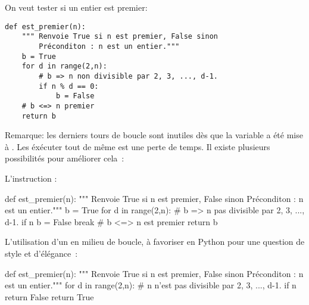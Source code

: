 

On veut tester si un entier  est premier:


\begin{lstlisting}
def est_premier(n):
    """ Renvoie True si n est premier, False sinon
        Préconditon : n est un entier."""
    b = True
    for d in range(2,n):
        # b => n non divisible par 2, 3, ..., d-1.
        if n % d == 0:
            b = False
    # b <=> n premier
    return b
\end{lstlisting}

Remarque: les derniers tours de boucle sont inutiles dès que la
variable  a été mise à . Les éxécuter tout de même est une perte de temps. Il 
existe plusieurs possibilités pour améliorer cela~:

L'instruction  :
\begin{pyverbatim}
def est_premier(n):
    """ Renvoie True si n est premier, False sinon
        Préconditon : n est un entier."""
    b = True
    for d in range(2,n):
        # b => n pas divisible par 2, 3, ..., d-1.
        if n %
            b = False
            break
    # b <=> n est premier
    return b
\end{pyverbatim}

L'utilisation d'un  en milieu de boucle, à favoriser en Python{} pour 
une question de style et d'élégance~:

\begin{pyverbatim}
def est_premier(n):
    """ Renvoie True si n est premier, False sinon
        Préconditon : n est un entier."""
    for d in range(2,n):
        # n n'est pas divisible par 2, 3, ..., d-1.
        if n %
            return False
    return True
\end{pyverbatim}